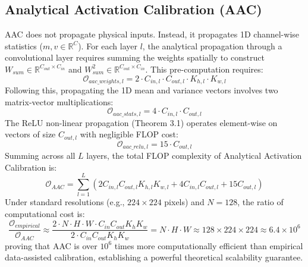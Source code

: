 \documentclass{article}
\theoremstyle{plain}
\theoremstyle{definition}
\theoremstyle{remark}
\begin{document}
\subsection{Analytical Activation Calibration (AAC)}
AAC does not propagate physical inputs. Instead, it propagates 1D channel-wise statistics ($m, v \in \mathbb{R}^{C}$). For each layer $l$, the analytical propagation through a convolutional layer requires summing the weights spatially to construct $W_{sum} \in \mathbb{R}^{C_{out} \times C_{in}}$ and $W^2_{sum} \in \mathbb{R}^{C_{out} \times C_{in}}$. This pre-computation requires:
\begin{equation}
    \mathcal{O}_{aac\_weights, l} = 2 \cdot C_{in, l} \cdot C_{out, l} \cdot K_{h, l} \cdot K_{w, l}
\end{equation}
Following this, propagating the 1D mean and variance vectors involves two matrix-vector multiplications:
\begin{equation}
    \mathcal{O}_{aac\_stats, l} = 4 \cdot C_{in, l} \cdot C_{out, l}
\end{equation}
The ReLU non-linear propagation (Theorem 3.1) operates element-wise on vectors of size $C_{out, l}$ with negligible FLOP cost:
\begin{equation}
    \mathcal{O}_{aac\_relu, l} = 15 \cdot C_{out, l}
\end{equation}
Summing across all $L$ layers, the total FLOP complexity of Analytical Activation Calibration is:
\begin{equation}
    \mathcal{O}_{AAC} = \sum_{l=1}^L \left( 2 C_{in, l} C_{out, l} K_{h, l} K_{w, l} + 4 C_{in, l} C_{out, l} + 15 C_{out, l} \right)
\end{equation}
Under standard resolutions (e.g., $224 \times 224$ pixels) and $N=128$, the ratio of computational cost is:
\begin{equation}
    \frac{\mathcal{O}_{empirical}}{\mathcal{O}_{AAC}} \approx \frac{2 \cdot N \cdot H \cdot W \cdot C_{in} C_{out} K_h K_w}{2 \cdot C_{in} C_{out} K_h K_w} = N \cdot H \cdot W \approx 128 \times 224 \times 224 \approx 6.4 \times 10^6
\end{equation}
proving that AAC is over $10^6$ times more computationally efficient than empirical data-assisted calibration, establishing a powerful theoretical scalability guarantee.
\end{document}
